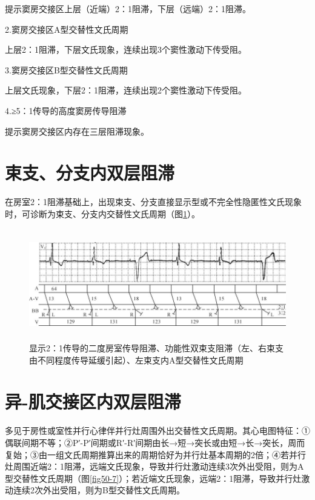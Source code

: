提示窦房交接区上层（近端）2：1阻滞，下层（远端）2：1阻滞。

2.窦房交接区A型交替性文氏周期

上层2：1阻滞，下层文氏现象，连续出现3个窦性激动下传受阻。

3.窦房交接区B型交替性文氏周期

上层文氏现象，下层2：1阻滞，连续出现2个窦性激动下传受阻。

4.≥5：1传导的高度窦房传导阻滞

提示窦房交接区内存在三层阻滞现象。

\protect\hypertarget{text00031.htmlux5cux23subid368}{}{}

\section{束支、分支内双层阻滞}

在房室2：1阻滞基础上，出现束支、分支直接显示型或不完全性隐匿性文氏现象时，可诊断为束支、分支内交替性文氏周期（图\ref{fig24-13}）。

\begin{figure}[!htbp]
 \centering
 \includegraphics[width=5.82292in,height=1.90625in]{./images/Image00408.jpg}
 \captionsetup{justification=centering}
 \caption{显示2：1传导的二度房室传导阻滞、功能性双束支阻滞（左、右束支由不同程度传导延缓引起）、左束支内A型交替性文氏周期}
 \label{fig24-13}
  \end{figure} 

\protect\hypertarget{text00031.htmlux5cux23subid369}{}{}

\section{异-肌交接区内双层阻滞}

多见于房性或室性并行心律伴并行灶周围外出交替性文氏周期。其心电图特征：①偶联间期不等；②P′-P′间期或R′-R′间期由长→短→突长或由短→长→突长，周而复始；③由一组文氏周期推算出来的周期恰好为并行灶基本周期的2倍；④若并行灶周围近端2：1阻滞，远端文氏现象，导致并行灶激动连续3次外出受阻，则为A型交替性文氏周期（图\ref{fig50-7}）；若近端文氏现象，远端2：1阻滞，导致并行灶激动连续2次外出受阻，则为B型交替性文氏周期。

